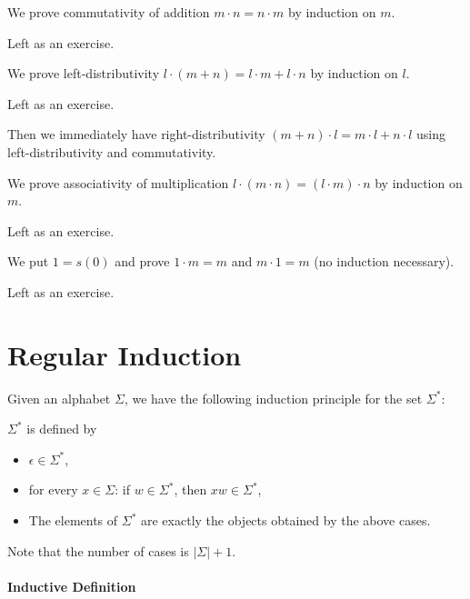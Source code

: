 \begin{example}
We prove commutativity of addition $m\cdot n=n\cdot m$ by induction on $m$.

Left as an exercise.
\end{example}

\begin{example}
We prove left-distributivity $l\cdot (m+n)=l\cdot m+l\cdot n$ by induction on $l$.

Left as an exercise.

Then we immediately have right-distributivity $(m+n)\cdot l=m\cdot l+n\cdot l$ using left-distributivity and commutativity.
\end{example}

\begin{example}
We prove associativity of multiplication $l\cdot (m\cdot n)=(l\cdot m)\cdot n$ by induction on $m$.

Left as an exercise.
\end{example}

\begin{example}
We put $1=s(0)$ and prove $1\cdot m=m$ and $m\cdot 1=m$ (no induction necessary).

Left as an exercise.
\end{example}

\section{Regular Induction}\label{sec:induction:reg}

Given an alphabet $\Sigma$, we have the following induction principle for the set $\Sigma^*$:
\begin{definition}
$\Sigma^*$ is defined by
 \begin{itemize}
   \item $\epsilon\in\Sigma^*$,
   \item for every $x\in\Sigma$: if $w\in\Sigma^*$, then $xw\in\Sigma^*$,
   \item The elements of $\Sigma^*$ are exactly the objects obtained by the above cases.
 \end{itemize}
\end{definition}

Note that the number of cases is $|\Sigma|+1$.

\paragraph{Inductive Definition}


